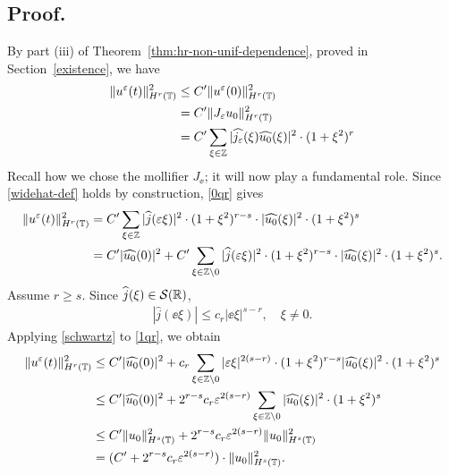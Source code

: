\subsection{Proof.} By part (iii) of Theorem~\ref{thm:hr-non-unif-dependence}, proved in Section~\ref{existence}, we have
\begin{equation}
\begin{split}
\|u^\varepsilon(t) \|_{H^r(\mathbb{T})}^2
& \le C' \|u^\varepsilon (0)\|_{H^r(\mathbb{T})}^2
\\
& = C' \|J_\varepsilon u_0\|_{H^r(\mathbb{T})}^2
\\
& = C' \sum_{\xi \in \mathbb{Z}} |\widehat{j_\varepsilon} (\xi) \widehat{u_0}(\xi)
|^2 \cdot (1 + \xi^2)^r
\label{0qr}
\end{split}
\end{equation}
Recall how we chose the mollifier $J_\ee$; it will now play a fundamental role. Since
\eqref{widehat-def} holds by construction, \eqref{0qr} gives 
\begin{equation}
\begin{split}
\|u^\varepsilon(t) \|_{H^r(\mathbb{T})}^2
& = C' \sum_{\xi \in \mathbb{Z}} |\widehat{j }(\varepsilon \xi)|^2 \cdot (1 +
\xi^2)^{r-s} \cdot |\widehat{u_0}(\xi)|^2 \cdot (1 + \xi^2)^s
\\
& = C'|\widehat{u_0}(0)|^2 +
C' \sum_{\xi \in \mathbb{Z} \setminus {0}} |\widehat{j }(\varepsilon \xi)|^2 \cdot (1 +
\xi^2)^{r-s} \cdot |\widehat{u_0}(\xi)|^2 \cdot (1 + \xi^2)^s.
\label{1qr}
\end{split}
\end{equation}
Assume $r \ge s$. Since $\widehat{j }(\xi) \in \mathcal{S}(\mathbb{R})$, 
\begin{equation}
\label{schwartz}
\begin{split}
|\widehat{j }(\ee \xi)| \le c_r |\ee \xi |^{s-r}, \quad \xi \neq 0.
\end{split}
\end{equation}
Applying \eqref{schwartz} to \eqref{1qr}, we obtain
\begin{equation}
\label{calc_ue}
\begin{split}
\|u^\varepsilon (t)\|_{H^r(\mathbb{T})}^2 
& \le C' |\widehat{u_0}(0) |^2 + c_r \sum_{\xi \in \mathbb{Z} \setminus
{0}} |\varepsilon \xi |^{2(s-r)} \cdot (1 + \xi^2)^{r-s}
|\widehat{u_0}(\xi) |^2 \cdot (1 + \xi^2)^s
\\
& \le C' |\widehat{u_0}(0) |^2 + 2^{r-s} c_r \varepsilon^{2(s-r)}
\sum_{\xi \in \mathbb{Z} \setminus {0}} |\widehat{u_0}(\xi)|^2 \cdot (1 +
\xi^2)^s
\\
& \le C' \|u_0\|_{H^s(\mathbb{T})}^2 + 2^{r-s} c_r \varepsilon^{2(s-r)}
\|u_0\|_{H^s(\mathbb{T})}^2
\\
& = (C' + 2^{r-s} c_r \varepsilon^{2(s-r)}) \cdot \|u_0\|^2_{H^s(\mathbb{T})}.
\end{split}
\end{equation}

